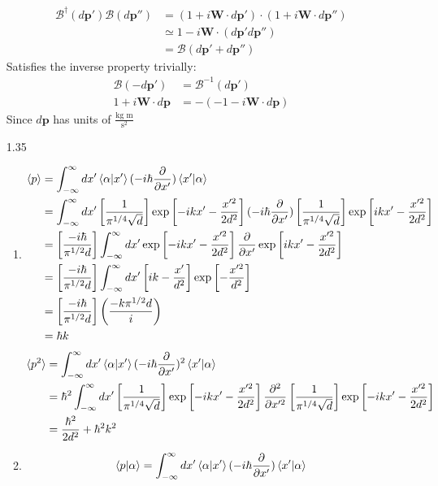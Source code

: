 \documentclass[12pt]{article}
\newcommand{\opp}{\pmb{\text{p}}}
\newcommand{\boostdag}{\mathscr{B}^{\dag}(d\opp')}
\newcommand{\opw}{\pmb{\text{W}}}
\newcommand{\p}[2]{\frac{\partial #1}{\partial #2}}
\begin{document}
\begin{enumerate}
\begin{align*}
      \boostdag\mathscr{B}(d\opp'')&=(1+i\opw\cdot d\opp')\cdot(1+i\opw\cdot d\opp'')\\
      &\simeq 1-i\opw\cdot(d\opp' d\opp'')\\
      &= \mathscr{B}(d\opp'+d\opp'')
    \end{align*}
    Satisfies the inverse property trivially:
    \begin{align*}
      \mathscr{B}(-d\opp')&=\mathscr{B}^{-1}(d\opp')\\
      1+i\opw\cdot d\opp&=-(-1-i\opw\cdot d\opp)
    \end{align*}
    Since $d\opp$ has units of $\frac{\text{kg m}}{\text{s}^2}$
    \item[1.35]
    \begin{enumerate}
      \item
      \begin{align*}
        \braket{p}&=\int_{-\infty}^{\infty}dx'\braket{\alpha|x'}(-i\hbar\p{}{x'})\braket{x'|\alpha}\\
        &=\int_{-\infty}^{\infty}dx'\left[\frac{1}{\pi^{1/4}\sqrt{d}}\right]\exp\left[-ikx'-\frac{x'^2}{2d^2}\right](-i\hbar\p{}{x'})\left[\frac{1}{\pi^{1/4}\sqrt{d}}\right]\exp\left[ikx'-\frac{x'^2}{2d^2}\right]\\
        &=\left[\frac{-i\hbar}{\pi^{1/2}d}\right]\int_{-\infty}^{\infty}dx'\exp\left[-ikx'-\frac{x'^2}{2d^2}\right]\p{}{x'}\exp\left[ikx'-\frac{x'^2}{2d^2}\right]\\
        &=\left[\frac{-i\hbar}{\pi^{1/2}d}\right]\int_{-\infty}^{\infty}dx'\left[ ik-\frac{x'}{d^2} \right]\exp\left[-\frac{x'^2}{d^2}\right]\\
        &=\left[\frac{-i\hbar}{\pi^{1/2}d}\right]\left(\frac{-k\pi^{1/2}d}{i}\right)\\
        &=\hbar k
      \end{align*}
      \begin{align*}
        \braket{p^2}&=\int_{-\infty}^{\infty}dx'\braket{\alpha|x'}(-i\hbar\p{}{x'})^2\braket{x'|\alpha}\\
        &=\hbar^2\int_{-\infty}^{\infty}dx'\left[\frac{1}{\pi^{1/4}\sqrt{d}}\right]\exp\left[-ikx'-\frac{x'^2}{2d^2}\right]\p{^2}{x'^2}\left[\frac{1}{\pi^{1/4}\sqrt{d}}\right]\exp\left[-ikx'-\frac{x'^2}{2d^2}\right]\\
        &=\frac{\hbar^2}{2d^2}+\hbar^2 k^2
      \end{align*}
      \item
      \begin{align*}
        \braket{p|\alpha}&=\int_{-\infty}^{\infty}dx'\braket{\alpha|x'}(-i\hbar\p{}{x'})\braket{x'|\alpha}\\

\end{align*}
\end{enumerate}
\end{enumerate}
\end{document}
